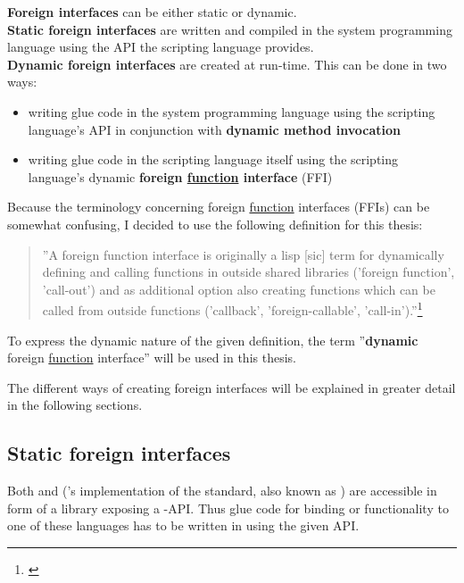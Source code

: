 \textbf{Foreign interfaces} can be either static or dynamic.\\
\textbf{Static foreign interfaces} are written and compiled in the system programming language using the API the scripting language provides.\\
\textbf{Dynamic foreign interfaces} are created at run-time. This can be done in two ways:
\begin{itemize}
\item writing glue code in the system programming language using the scripting language's API in conjunction with \textbf{dynamic method invocation}
\item writing glue code in the scripting language itself using the scripting language's dynamic \textbf{foreign \underline{function} interface} (FFI)
\end{itemize}

Because the terminology concerning foreign \underline{function} interfaces (FFIs) can be somewhat confusing, I decided to use the following definition for this thesis:

\begin{quotation}
''A foreign function interface is originally a lisp [sic] term for dynamically defining and calling functions in outside shared libraries ('foreign function', 'call-out') and as additional option also creating functions which can be called from outside functions ('callback', 'foreign-callable', 'call-in').''\footnote{\citep{DesignFFI}}
\end{quotation}

To express the dynamic nature of the given definition, the term ''\textbf{dynamic} foreign \underline{function} interface'' will be used in this thesis.

The different ways of creating foreign interfaces will be explained in greater detail in the following sections.

\subsection{Static foreign interfaces}

Both  and  ('s implementation of the  standard, also known as ) are accessible in form of a library exposing a -API. Thus glue code for binding  or  functionality to one of these languages has to be written in  using the given API.

